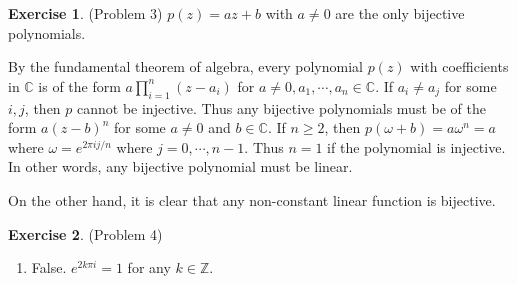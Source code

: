 \documentclass[12pt, psamsfonts]{amsart}
\theoremstyle{definition}
\newtheorem*{exer}{Exercise}
\theoremstyle{remark}
\numberwithin{equation}{section}
\begin{document}
\begin{exer}{(Problem 3)}
  $p(z) = az + b$ with $a \ne 0$ are the only bijective polynomials.

  By the fundamental theorem of algebra, every polynomial $p(z)$ with coefficients in $\mathbb{C}$ is of the form $a\prod_{i=1}^{n}(z - a_i)$ for $a \ne 0, a_1, \cdots, a_n \in \mathbb{C}$.
  If $a_i \ne a_j$ for some $i, j$, then $p$ cannot be injective.
  Thus any bijective polynomials must be of the form $a(z - b)^n$ for some $a \ne 0$ and $b \in \mathbb{C}$.
  If $n \geq 2$, then $p(\omega + b) = a\omega^n = a$ where $\omega = e^{2\pi i j / n}$ where $j = 0, \cdots, n - 1$.
  Thus $n = 1$ if the polynomial is injective.
  In other words, any bijective polynomial must be linear.

  On the other hand, it is clear that any non-constant linear function is bijective.
\end{exer}

\begin{exer}{(Problem 4)}
 $ $
  \begin{enumerate}[label=(\alph*)]
    \item 
      False. $e^{2k\pi i} = 1$ for any $k \in \mathbb{Z}$.
  \end{enumerate}
\end{exer}
\end{document}
